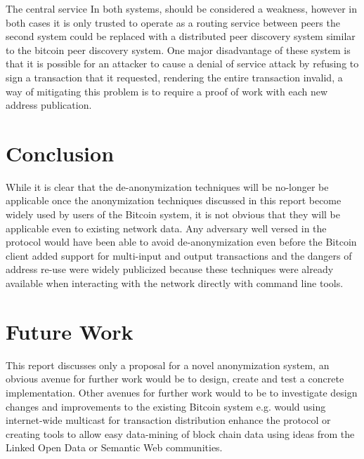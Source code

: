 The central service In both systems, should be considered a weakness, however in both cases it is only trusted to operate as a routing service between peers the second system could be replaced with a distributed peer discovery system similar to the bitcoin peer discovery system.  One major disadvantage of these system is that it is possible for an attacker to cause a denial of service attack by refusing to sign a transaction that it requested, rendering the entire transaction invalid, a way of mitigating this problem is to require a proof of work with each new address publication.

\section{Conclusion}
While it is clear that the de-anonymization techniques will be no-longer be applicable once the anonymization techniques discussed in this report become widely used by users of the Bitcoin system, it is not obvious that they will be applicable even to existing network data. Any adversary well versed in the protocol would have been able to avoid de-anonymization even before the Bitcoin client\cite{bitcoin-qt} added support for multi-input and output transactions and the dangers of address re-use were widely publicized because these techniques were already available when interacting with the network directly with command line tools.

\section{Future Work}
This report discusses only a proposal for a novel anonymization system, an obvious avenue for further work would be to design, create and test a concrete implementation. Other avenues for further work would to be to investigate design changes and improvements to the existing Bitcoin system e.g. would using internet-wide multicast for transaction distribution enhance the protocol or creating tools to allow easy data-mining of block chain data using ideas from the Linked Open Data or Semantic Web communities.



